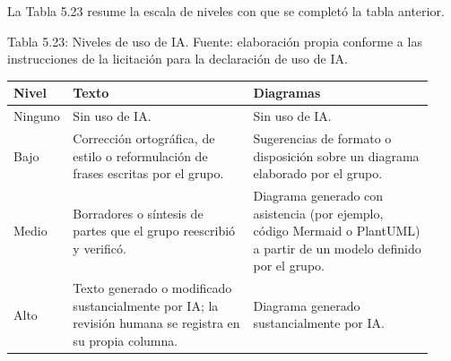 \documentclass[11pt]{article}
\begin{document}
\par

La Tabla 5.23 resume la escala de niveles con que se completó la tabla anterior.

\par\vspace{0.6\baselineskip}\noindent\begin{minipage}{\linewidth}
Tabla 5.23: Niveles de uso de IA. Fuente: elaboración propia conforme a las instrucciones de la licitación para la declaración de uso de IA.\label{tab:niveles}\par\vspace{0.3\baselineskip}
\begin{tabular}{@{}p{0.069\linewidth}p{0.429\linewidth}p{0.429\linewidth}@{}}
\toprule Nivel & Texto & Diagramas \\
\midrule
Ninguno & Sin uso de IA. & Sin uso de IA. \\
Bajo & Corrección ortográfica, de estilo o reformulación de frases escritas por el grupo. & Sugerencias de formato o disposición sobre un diagrama elaborado por el grupo. \\
Medio & Borradores o síntesis de partes que el grupo reescribió y verificó. & Diagrama generado con asistencia (por ejemplo, código Mermaid o PlantUML) a partir de un modelo definido por el grupo. \\
Alto & Texto generado o modificado sustancialmente por IA; la revisión humana se registra en su propia columna. & Diagrama generado sustancialmente por IA. \\
\bottomrule
\end{tabular}
\end{minipage}
\par


\ossFinalPage
\end{document}
